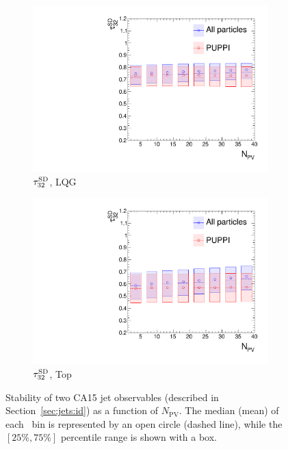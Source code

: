 \begin{figure}[]
\begin{center}
\begin{subfigure}[t]{0.35\textwidth}
            \includegraphics[width=\textwidth]{figures/toptagging/gen/npv_clf_Tau32SD_QCD.pdf}
            \caption{$\tau_{32}^{\mathrm{SD}}$, LQG}
        \end{subfigure}
        \begin{subfigure}[t]{0.35\textwidth}
            \includegraphics[width=\textwidth]{figures/toptagging/gen/npv_clf_Tau32SD_ZpTT_lo.pdf}
            \caption{$\tau_{32}^{\mathrm{SD}}$, Top}
        \end{subfigure}
        \caption{Stability of two CA15 jet observables (described in Section~\ref{sec:jets:id}) as a function of $N_\mathrm{PV}$.
            The median (mean) of each \NPV~bin is represented by an open circle (dashed line), while the $[25\%,75\%]$ percentile range is shown with a box.}
        \label{fig:jets:puppi}
    \end{center}
\end{figure}



